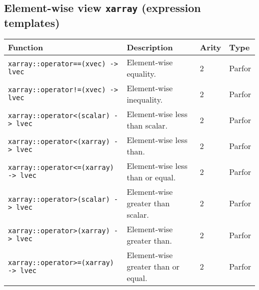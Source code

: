 \documentclass{article}
\begin{document}
\subsection*{Element-wise view \texttt{xarray} (expression templates)}
\begin{tabular}{|p{7.2cm}|p{5.8cm}|p{0.95cm}|p{1.15cm}|}
\hline
\textbf{Function} & \textbf{Description} & \textbf{Arity} & \textbf{Type}\\\hline
\lstinline|xarray::operator==(xvec) -> lvec| & Element-wise equality. & 2 & Parfor \\\hline
\lstinline|xarray::operator!=(xvec) -> lvec| & Element-wise inequality. & 2 & Parfor \\\hline
\lstinline|xarray::operator<(scalar) -> lvec| & Element-wise less than scalar. & 2 & Parfor \\\hline
\lstinline|xarray::operator<(xarray) -> lvec| & Element-wise less than. & 2 & Parfor \\\hline
\lstinline|xarray::operator<=(xarray) -> lvec| & Element-wise less than or equal. & 2 & Parfor \\\hline
\lstinline|xarray::operator>(scalar) -> lvec| & Element-wise greater than scalar. & 2 & Parfor \\\hline
\lstinline|xarray::operator>(xarray) -> lvec| & Element-wise greater than. & 2 & Parfor \\\hline
\lstinline|xarray::operator>=(xarray) -> lvec| & Element-wise greater than or equal. & 2 & Parfor \\\hline
\end{tabular}
\end{document}
